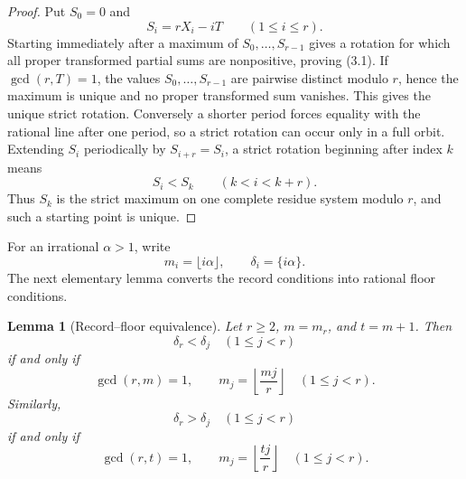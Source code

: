 \documentclass[11pt]{article}
\newtheorem{lemma}[theorem]{Lemma}
\begin{document}
\begin{proof}
Put \(S_0=0\) and
\[
 S_i=rX_i-iT\qquad(1\leq i\leq r).
\]
Starting immediately after a maximum of
\(S_0,\ldots,S_{r-1}\) gives a rotation for which all proper transformed
partial sums are nonpositive, proving (3.1). If \(\gcd(r,T)=1\), the values
\(S_0,\ldots,S_{r-1}\) are pairwise distinct modulo \(r\), hence the
maximum is unique and no proper transformed sum vanishes. This gives the
unique strict rotation. Conversely a shorter period forces equality with
the rational line after one period, so a strict rotation can occur only in
a full orbit. Extending \(S_i\) periodically by \(S_{i+r}=S_i\), a strict
rotation beginning after index \(k\) means
\[
 S_i<S_k\qquad(k<i<k+r).
\]
Thus \(S_k\) is the strict maximum on one complete residue system modulo
\(r\), and such a starting point is unique.
\end{proof}

For an irrational \(\alpha>1\), write
\[
 m_i=\lfloor i\alpha\rfloor,
 \qquad
 \delta_i=\{i\alpha\}.
\]
The next elementary lemma converts the record conditions into rational
floor conditions.

\begin{lemma}[Record--floor equivalence]
\label{lem:record-floor}
Let \(r\geq2\), \(m=m_r\), and \(t=m+1\). Then
\[
 \delta_r<\delta_j\quad(1\leq j<r)
 \tag{3.2}
\]
if and only if
\[
 \gcd(r,m)=1,
 \qquad
 m_j=\left\lfloor\frac{mj}{r}\right\rfloor
 \quad(1\leq j<r).
 \tag{3.3}
\]
Similarly,
\[
 \delta_r>\delta_j\quad(1\leq j<r)
 \tag{3.4}
\]
if and only if
\[
 \gcd(r,t)=1,
 \qquad
 m_j=\left\lfloor\frac{tj}{r}\right\rfloor
 \quad(1\leq j<r).
 \tag{3.5}
\]
\end{lemma}
\end{document}
